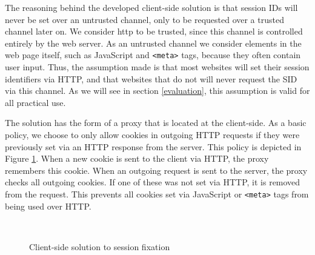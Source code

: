 The reasoning behind the developed client-side solution is that session IDs will never be set over an untrusted channel, only to be requested over a trusted channel later on. We consider \gls{http} to be trusted, since this channel is controlled entirely by the web server. As an untrusted channel we consider elements in the web page itself, such as JavaScript and \texttt{<meta>} tags, because they often contain user input. Thus, the assumption made is that most websites will set their session identifiers via HTTP, and that websites that do not will never request the SID via this channel. As we will see in section \ref{evaluation}, this assumption is valid for all practical use.

The solution has the form of a proxy that is located at the client-side. As a basic policy, we choose to only allow cookies in outgoing HTTP requests if they were previously set via an HTTP response from the server. This policy is depicted in Figure \ref{fig:clientside-proxy}. When a new cookie is sent to the client via HTTP, the proxy remembers this cookie. When an outgoing request is sent to the server, the proxy checks all outgoing cookies. If one of these was not set via HTTP, it is removed from the request. This prevents all cookies set via JavaScript or \texttt{<meta>} tags from being used over HTTP.

\begin{figure}[htb]
	\centering
	\\
	\caption{Client-side solution to session fixation}
	\label{fig:clientside-proxy}
\end{figure}

